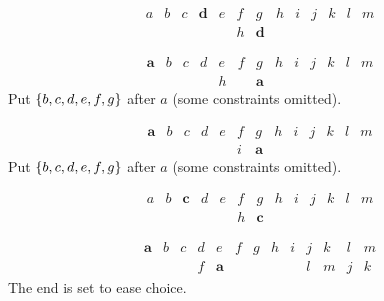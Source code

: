 \documentclass[pagesize, twoside=off, bibliography=totoc, DIV=calc, fontsize=12pt, a4paper]{scrartcl}
\begin{document}
\begin{example}[$\Delta^\text{min} = 2$; $\delta = 1$; $\lprof(x) = (3, 6)$ thus cl $11$]
	\begin{equation}
		\begin{array}{lllllllllllll}
			a	& b	& c	& \bm{d}	& e	& f	& g	& h	& i & j & k & l & m\\
			& & & & & h & \bm{d}
		\end{array}
	\end{equation}
\end{example}

\begin{example}[spread $x$: 6, spread $y$: 3, $\max \lprof(y) = 7$]
	\begin{equation}
		\begin{array}{lllllllllllll}
			\bm{a}	& b	& c	& d	& e	& f	& g	& h	& i & j & k & l & m\\
			& & & & h & & \bm{a}
		\end{array}
	\end{equation}
	Put $\{b, c, d, e, f, g\}$ after $a$ (some constraints omitted).
\end{example}

\begin{example}[spread $x$: 6, spread $y$: 3, $\max \lprof(y) = 8$]
	\begin{equation}
		\begin{array}{lllllllllllll}
			\bm{a}	& b	& c	& d	& e	& f	& g	& h	& i & j & k & l & m\\
			& & & & & i & \bm{a}
		\end{array}
	\end{equation}
	Put $\{b, c, d, e, f, g\}$ after $a$ (some constraints omitted).
\end{example}

\begin{example}[spread $x$: 4, spread $y$: 2, $\rho = 6$]
	\begin{equation}
		\begin{array}{lllllllllllll}
			a	& b	& \bm{c}	& d	& e	& f	& g	& h	& i & j & k & l & m\\
			& & & & & h & \bm{c}
		\end{array}
	\end{equation}
\end{example}

\begin{example}[spread $x$: 4, spread $y$: 2, $\rho = 4$]
	\begin{equation}
		\begin{array}{lllllllllllll}
			\bm{a}	& b	& c	& d	& e	& f	& g	& h	& i & j & k & l & m\\
			& & & f & \bm{a} & & & & & l & m & j & k
		\end{array}
	\end{equation}
	The end is set to ease choice.
\end{example}
\end{document}

